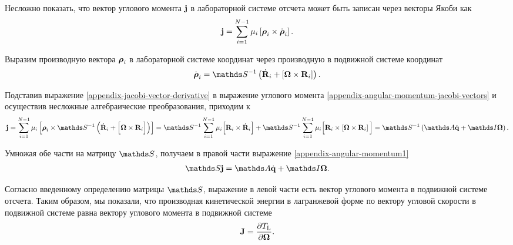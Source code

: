     Несложно показать, что вектор углового момента $\mathbf{j}$ в лабораторной системе отсчета может быть записан через векторы Якоби как
    \begin{gather}
        \mathbf{j} = \sum_{i = 1}^{N - 1} \mu_i \left[ \boldsymbol{\rho}_i \times \dot{\boldsymbol{\rho}}_i \right]. \label{appendix-angular-momentum-jacobi-vectors}
    \end{gather}

    Выразим производную вектора $\boldsymbol{\rho}_i$ в лабораторной системе координат через производную в подвижной системе координат 
    \begin{gather}
        \dot{\bs{\rho}}_i = \bbS^{-1} \lb \dot{\mf{R}}_i + \lsq \bs{\Omega} \times \mf{R}_i \rsq \rb. \label{appendix-jacobi-vector-derivative} 
    \end{gather}

    Подставив выражение \eqref{appendix-jacobi-vector-derivative} в выражение углового момента \eqref{appendix-angular-momentum-jacobi-vectors} и осуществив несложные алгебраические преобразования, приходим к 
    \begin{gather}
        \mf{j} = \sum_{i = 1}^{N-1} \mu_i \lsq \bs{\rho}_i \times \bbS^{-1} \lb \dot{\mf{R}}_i + \Big[ \bOmega \times \mf{R}_i \Big] \rb \rsq = \bbS^{-1} \sum_{i = 1}^{N-1} \mu_i \Big[ \mf{R}_i \times \dot{\mf{R}}_i \Big] + \bbS^{-1} \sum_{i = 1}^{N-1} \mu_i \Big[ \mf{R}_i \times \lsq \bOmega \times \mf{R}_i \rsq \Big] = \bbS^{-1} \lb \bbA \dot{\mf{q}} + \bbI \bOmega \rb.
    \end{gather}

    Умножая обе части на матрицу $\bbS$, получаем в правой части выражение \eqref{appendix-angular-momentum1}
    \begin{gather}
        \bbS \mf{j} = \bbA \dot{\mf{q}} + \bbI \bOmega.
    \end{gather}

    Согласно введенному определению матрицы $\bbS$, выражение в левой части есть вектор углового момента в подвижной системе отсчета. Таким образом, мы показали, что производная кинетической энергии в лагранжевой форме по вектору угловой скорости в подвижной системе равна вектору углового момента в подвижной системе
    \begin{gather}
        \mathbf{J} = \frac{\partial T_\text{L}}{\partial \boldsymbol{\Omega}}.
    \end{gather}
    
